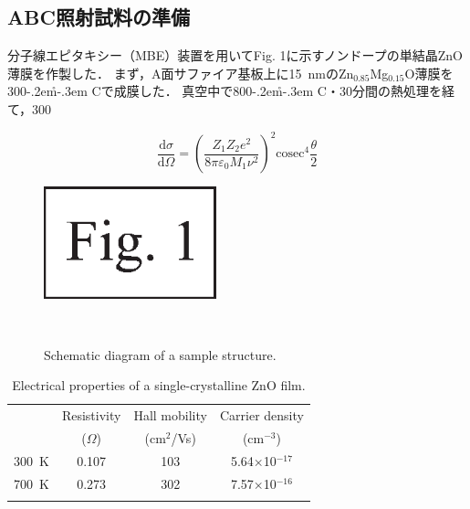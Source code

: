 \documentclass{ujarticle}
\def\HLINE{\noalign{\hrule height1pt}}    %
\def\degC{\kern-.2em\r{}\kern-.3em C}   %
\newenvironment{jsmseq}
{
\vspace*{-1mm}
\begin{flushleft}
\begin{minipage}{0.45\textwidth}
\begin{equation}
}
{
\end{equation}
\end{minipage}
\end{flushleft}
}
\begin{document}
{\begin{multicols}{2}
\section{ABC照射試料の準備}

分子線エピタキシー（MBE）装置を用いてFig. 1に示すノンドープの単結晶ZnO薄膜を作製した．
まず，A面サファイア基板上に15~nmのZn$_{0.85}$Mg$_{0.15}$O薄膜を300\degC で成膜した．
真空中で800\degC ・30分間の熱処理を経て，300

\begin{jsmseq}
	\frac{\mathrm{d}\sigma}{\mathrm{d}\Omega}
	=
	\left(
		\frac{Z_{1}Z_{2}e^{2}}{8\pi\varepsilon_{0}M_{1}\nu^{2}}
	\right)^{2}
	\mathrm{cosec}^{4}\frac{\theta}{2}
\label{eq:1}   %
\end{jsmseq}

\begin{figure}[H]
	\centering\includegraphics[keepaspectratio, width=50mm]{images/Fig1.eps}　%
	\caption{Schematic diagram of a sample structure.}　%
	\label{fig1}  %
\end{figure}

\begin{table}[H]
	\caption{Electrical properties of a single-crystalline ZnO film.}
	\label{table1}
	\begin{center}
		\small
		\begin{tabular}{cccc}
			\HLINE
			& Resistivity & Hall mobility & Carrier density \\
			& ($\Omega$) & (cm$^2$/Vs) & (cm$^{-3}$)  \\
			\HLINE
			300~K & 0.107 & 103 & 5.64$\times$10$^{-17}$ \\
			700~K & 0.273 & 302 & 7.57$\times$10$^{-16}$ \\
			\HLINE
		\end{tabular}
	\end{center}
\end{table}


\end{multicols}}
\end{document}
